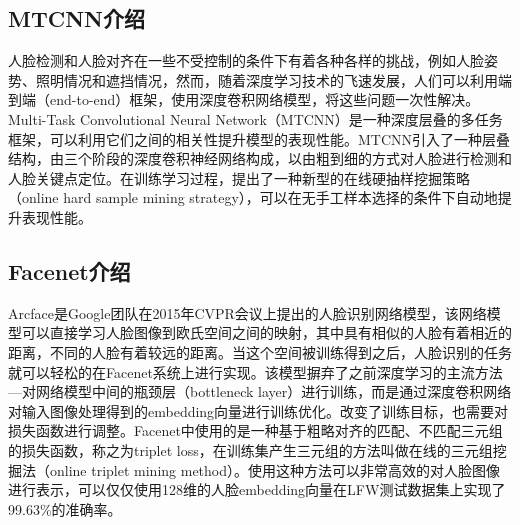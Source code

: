 \subsection{MTCNN介绍}
人脸检测和人脸对齐在一些不受控制的条件下有着各种各样的挑战，例如人脸姿势、照明情况和遮挡情况，然而，随着深度学习技术的飞速发展，人们可以利用端到端（end-to-end）框架，使用深度卷积网络模型，将这些问题一次性解决。Multi-Task Convolutional Neural Network（MTCNN\cite{mtcnn}）是一种深度层叠的多任务框架，可以利用它们之间的相关性提升模型的表现性能。MTCNN引入了一种层叠结构，由三个阶段的深度卷积神经网络构成，以由粗到细的方式对人脸进行检测和人脸关键点定位。在训练学习过程，提出了一种新型的在线硬抽样挖掘策略（online hard sample mining strategy），可以在无手工样本选择的条件下自动地提升表现性能。

\subsection{Facenet介绍}

Arcface\cite{facenet}是Google团队在2015年CVPR会议上提出的人脸识别网络模型，该网络模型可以直接学习人脸图像到欧氏空间之间的映射，其中具有相似的人脸有着相近的距离，不同的人脸有着较远的距离。当这个空间被训练得到之后，人脸识别的任务就可以轻松的在Facenet系统上进行实现。该模型摒弃了之前深度学习的主流方法---对网络模型中间的瓶颈层（bottleneck layer）进行训练，而是通过深度卷积网络对输入图像处理得到的embedding向量进行训练优化。改变了训练目标，也需要对损失函数进行调整。Facenet中使用的是一种基于粗略对齐的匹配、不匹配三元组的损失函数，称之为triplet loss，在训练集产生三元组的方法叫做在线的三元组挖掘法（online triplet mining method）。使用这种方法可以非常高效的对人脸图像进行表示，可以仅仅使用128维的人脸embedding向量在LFW测试数据集上实现了99.63\%的准确率。